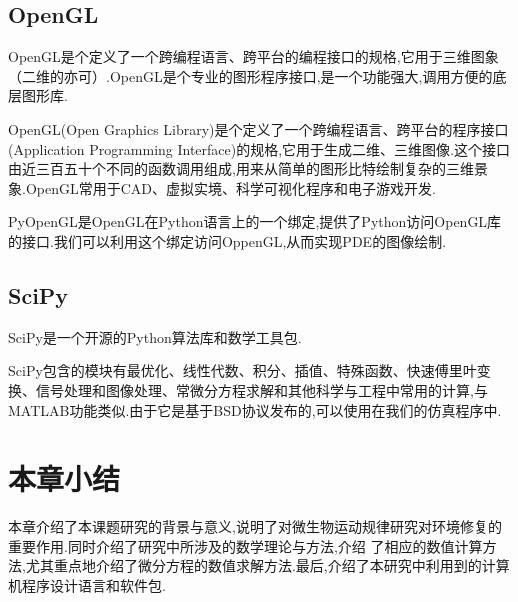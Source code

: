\subsection{OpenGL}
OpenGL是个定义了一个跨编程语言、跨平台的编程接口的规格,它用于三维图象（二维的亦可）.OpenGL是个专业的图形程序接口,是一个功能强大,调用方便的底层图形库.\par
OpenGL(Open Graphics Library)是个定义了一个跨编程语言、跨平台的程序接口(Application Programming Interface)的规格,它用于生成二维、三维图像.这个接口由近三百五十个不同的函数调用组成,用来从简单的图形比特绘制复杂的三维景象.OpenGL常用于CAD、虚拟实境、科学可视化程序和电子游戏开发.\par
PyOpenGL是OpenGL在Python语言上的一个绑定,提供了Python访问OpenGL库的接口.我们可以利用这个绑定访问OppenGL,从而实现PDE的图像绘制.
\subsection{SciPy}
SciPy是一个开源的Python算法库和数学工具包.\par
SciPy包含的模块有最优化、线性代数、积分、插值、特殊函数、快速傅里叶变换、信号处理和图像处理、常微分方程求解和其他科学与工程中常用的计算,与MATLAB功能类似.由于它是基于BSD协议发布的,可以使用在我们的仿真程序中.
\section{本章小结}
本章介绍了本课题研究的背景与意义,说明了对微生物运动规律研究对环境修复的重要作用.同时介绍了研究中所涉及的数学理论与方法,介绍
了相应的数值计算方法,尤其重点地介绍了微分方程的数值求解方法.最后,介绍了本研究中利用到的计算机程序设计语言和软件包.